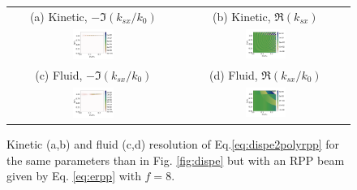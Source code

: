\documentclass[
 reprint,
 amsmath,amssymb,
 aps,
]{revtex4-1}
\begin{document}
 \begin{figure}
\begin{tabular}{cc}
(a) Kinetic, $-\Im(k_{sx}/k_0)$ &
(b)  Kinetic, $\Re(k_{sx})$ \\
\includegraphics[width=0.25\textwidth]{Grpp_Hp.png}&
\includegraphics[width=0.25\textwidth]{krpp_Hp.png}\\
(c) Fluid, $-\Im(k_{sx}/k_0)$  &
(d) Fluid, $\Re(k_{sx}/k_0)$  \\
\includegraphics[width=0.25\textwidth]{Gfrpp_Hp.png}&
\includegraphics[width=0.25\textwidth]{kfrpp_Hp.png}
\end{tabular}
\caption{ \label{fig:disperpp}  
Kinetic (a,b) and fluid (c,d) resolution of Eq.\eqref{eq:dispe2polyrpp} for  the same parameters than in Fig. \ref{fig:dispe} but with an RPP beam given by Eq. \eqref{eq:erpp} with $f=8$. 
 }
\end{figure}
\end{document}
